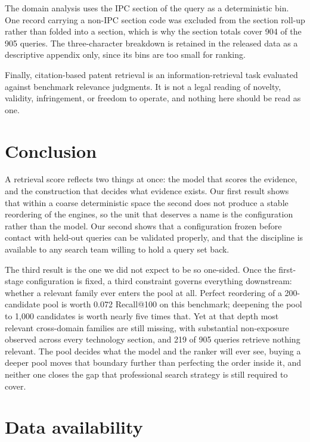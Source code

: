 \documentclass[preprint,11pt,authoryear]{elsarticle}          %
\begin{document}
The domain analysis uses the IPC section of the query as a deterministic bin. One record carrying a non-IPC section code was excluded from the section roll-up rather than folded into a section, which is why the section totals cover 904 of the 905 queries. The three-character breakdown is retained in the released data as a descriptive appendix only, since its bins are too small for ranking.

Finally, citation-based patent retrieval is an information-retrieval task evaluated against benchmark relevance judgments. It is not a legal reading of novelty, validity, infringement, or freedom to operate, and nothing here should be read as one.

\section{Conclusion}

A retrieval score reflects two things at once: the model that scores the evidence, and the construction that decides what evidence exists. Our first result shows that within a coarse deterministic space the second does not produce a stable reordering of the engines, so the unit that deserves a name is the configuration rather than the model. Our second shows that a configuration frozen before contact with held-out queries can be validated properly, and that the discipline is available to any search team willing to hold a query set back.

The third result is the one we did not expect to be so one-sided. Once the first-stage configuration is fixed, a third constraint governs everything downstream: whether a relevant family ever enters the pool at all. Perfect reordering of a 200-candidate pool is worth 0.072 Recall@100 on this benchmark; deepening the pool to 1{,}000 candidates is worth nearly five times that. Yet at that depth most relevant cross-domain families are still missing, with substantial non-exposure observed across every technology section, and 219 of 905 queries retrieve nothing relevant. The pool decides what the model and the ranker will ever see, buying a deeper pool moves that boundary further than perfecting the order inside it, and neither one closes the gap that professional search strategy is still required to cover.

\section*{Data availability}
\label{sec:data}
\end{document}
